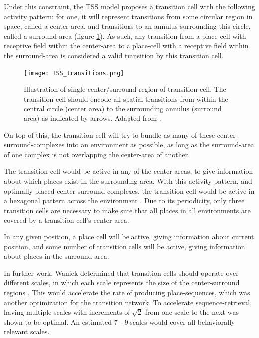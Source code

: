 \documentclass{article}
\begin{document}
    Under this constraint, the TSS model proposes a transition cell with the following activity pattern: for one, it will represent transitions from some circular region in space, called a center-area, and transitions to an annulus surrounding this circle, called a surround-area (figure \ref{TSS_transitions}). As such, any transition from a place cell with receptive field within the center-area to a place-cell with a receptive field within the surround-area is considered a valid transition by this transition cell.

    \begin{figure}
        \centering
        \vspace*{-0.1\linewidth}
        \texttt{[image: TSS\_transitions.png]}
        \vspace*{-0.15\linewidth}
        \caption{Illustration of single center/surround region of transition cell. The transition cell should encode all spatial transitions from within the central circle (center area) to the surrounding annulus (surround area) as indicated by arrows. Adapted from \cite{Waniek2023}.}
        \label{TSS_transitions}
    \end{figure}

    On top of this, the transition cell will try to bundle as many of these center-surround-complexes into an environment as possible, as long as the surround-area of one complex is not overlapping the center-area of another.

    The transition cell would be active in any of the center areas, to give information about which places exist in the surrounding area. With this activity pattern, and optimally placed center-surround complexes, the transition cell would be active in a hexagonal pattern across the environment \parencite{Waniek2018,Kunsch2005}. Due to its periodicity, only three transition cells are necessary to make sure that all places in all environments are covered by a transition cell's center-area. 
    
    In any given position, a place cell will be active, giving information about current position, and some number of transition cells will be active, giving information about places in the surround area.

    In further work, Waniek determined that transition cells should operate over different scales, in which each scale represents the size of the center-surround regions \parencite{Waniek2020}. This would accelerate the rate of producing place-sequences, which was another optimization for the transition network. To accelerate sequence-retrieval, having multiple scales with increments of \(\sqrt{2}\) from one scale to the next was shown to be optimal. An estimated 7 - 9 scales would cover all behaviorally relevant scales.
\end{document}
